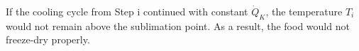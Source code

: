 If the cooling cycle from Step i continued with constant \( \dot{Q}_K \), the temperature \( T_i \) would not remain above the sublimation point. As a result, the food would not freeze-dry properly.